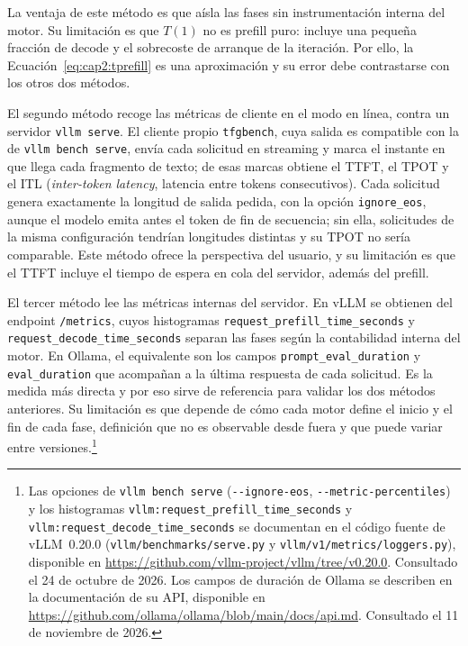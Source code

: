 La ventaja de este método es que aísla las fases sin instrumentación interna del motor. Su limitación es que $T(1)$ no es prefill puro: incluye una pequeña fracción de decode y el sobrecoste de arranque de la iteración. Por ello, la Ecuación~\ref{eq:cap2:tprefill} es una aproximación y su error debe contrastarse con los otros dos métodos.

El segundo método recoge las métricas de cliente en el modo en línea, contra un servidor \texttt{vllm serve}. El cliente propio \texttt{tfgbench}, cuya salida es compatible con la de \texttt{vllm bench serve}, envía cada solicitud en streaming y marca el instante en que llega cada fragmento de texto; de esas marcas obtiene el TTFT, el TPOT y el ITL (\textit{inter-token latency}, latencia entre tokens consecutivos). Cada solicitud genera exactamente la longitud de salida pedida, con la opción \texttt{ignore\_eos}, aunque el modelo emita antes el token de fin de secuencia; sin ella, solicitudes de la misma configuración tendrían longitudes distintas y su TPOT no sería comparable. Este método ofrece la perspectiva del usuario, y su limitación es que el TTFT incluye el tiempo de espera en cola del servidor, además del prefill.

El tercer método lee las métricas internas del servidor. En vLLM se obtienen del endpoint \texttt{/metrics}, cuyos histogramas \texttt{request\_\allowbreak prefill\_\allowbreak time\_\allowbreak seconds} y \texttt{request\_\allowbreak decode\_\allowbreak time\_\allowbreak seconds} separan las fases según la contabilidad interna del motor. En Ollama, el equivalente son los campos \texttt{prompt\_eval\_duration} y \texttt{eval\_duration} que acompañan a la última respuesta de cada solicitud. Es la medida más directa y por eso sirve de referencia para validar los dos métodos anteriores. Su limitación es que depende de cómo cada motor define el inicio y el fin de cada fase, definición que no es observable desde fuera y que puede variar entre versiones.\footnote{Las opciones de \texttt{vllm bench serve} (\texttt{-{}-ignore-eos}, \texttt{-{}-metric-percentiles}) y los histogramas \texttt{vllm:request\_prefill\_time\_seconds} y \texttt{vllm:request\_decode\_time\_seconds} se documentan en el código fuente de vLLM~0.20.0 (\texttt{vllm/benchmarks/serve.py} y \texttt{vllm/v1/metrics/loggers.py}), disponible en \url{https://github.com/vllm-project/vllm/tree/v0.20.0}. Consultado el 24 de octubre de 2026. Los campos de duración de Ollama se describen en la documentación de su API, disponible en \url{https://github.com/ollama/ollama/blob/main/docs/api.md}. Consultado el 11 de noviembre de 2026.}

